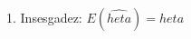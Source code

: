 \documentclass[preview]{standalone}
\begin{document}
\begin{center}
1. Insesgadez: $E(\hat{	heta}) = 	heta$
\end{center}
\end{document}
